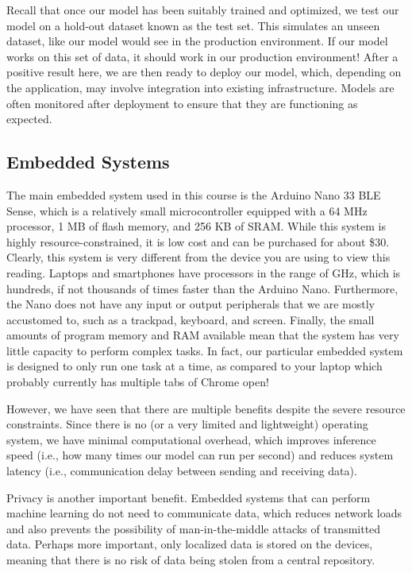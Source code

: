 Recall that once our model has been suitably trained and optimized, we test our model on a hold-out dataset known as the test set. This simulates an unseen dataset, like our model would see in the production environment. If our model works on this set of data, it should work in our production environment! After a positive result here, we are then ready to deploy our model, which, depending on the application, may involve integration into existing infrastructure. Models are often monitored after deployment to ensure that they are functioning as expected. 

\subsection{Embedded Systems}

The main embedded system used in this course is the Arduino Nano 33 BLE Sense, which is a relatively small microcontroller equipped with a 64 MHz processor, 1 MB of flash memory, and 256 KB of SRAM. While this system is highly resource-constrained, it is low cost and can be purchased for about \$30. Clearly, this system is very different from the device you are using to view this reading. Laptops and smartphones have processors in the range of GHz, which is hundreds, if not thousands of times faster than the Arduino Nano. Furthermore, the Nano does not have any input or output peripherals that we are mostly accustomed to, such as a trackpad, keyboard, and screen. Finally, the small amounts of program memory and RAM available mean that the system has very little capacity to perform complex tasks. In fact, our particular embedded system is designed to only run one task at a time, as compared to your laptop which probably currently has multiple tabs of Chrome open!

However, we have seen that there are multiple benefits despite the severe resource constraints. Since there is no (or a very limited and lightweight) operating system, we have minimal computational overhead, which improves inference speed (i.e., how many times our model can run per second) and reduces system latency (i.e., communication delay between sending and receiving data). 

Privacy is another important benefit. Embedded systems that can perform machine learning do not need to communicate data, which reduces network loads and also prevents the possibility of man-in-the-middle attacks of transmitted data. Perhaps more important, only localized data is stored on the devices, meaning that there is no risk of data being stolen from a central repository.

